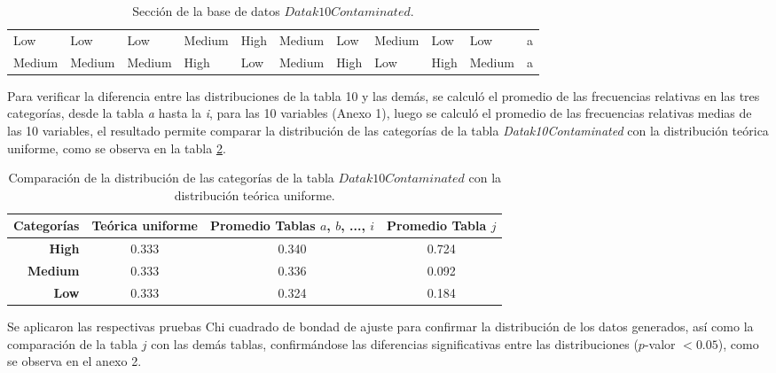 \documentclass[mathematics,article,submit,moreauthors,pdftex]{mdpi}
\begin{document}
\begin{table}[!ht]
{\begin{tabular}{@{}lllllllllll@{}}
Low  & Low    & Low  & Medium & High & Medium & Low    & Medium & Low    & Low    & a                         \\
Medium                       & Medium                         & Medium                       & High                           & Low                          & Medium                         & High                           & Low                            & High                           & Medium                         & a \\ \bottomrule
\end{tabular}
}

\caption{Sección de la base de datos $Datak10Contaminated$.}

\label{tab:tabladatos}

\end{table}

Para verificar la diferencia entre las distribuciones de la tabla 10 y
las demás, se calculó el promedio de las frecuencias relativas en las
tres categorías, desde la tabla \emph{a} hasta la \emph{i}, para las 10
variables (Anexo 1), luego se calculó el promedio de las frecuencias
relativas medias de las 10 variables, el resultado permite comparar la
distribución de las categorías de la tabla \emph{Datak10Contaminated}
con la distribución teórica uniforme, como se observa en la tabla
\ref{tab:tablapromfreq}.

\begin{table}[H]
\centering
\begin{tabular}{rccc}
\hline
\toprule

\textbf{Categorías} & \textbf{Teórica uniforme} & \textbf{Promedio Tablas $a$, $b$, ...,  $i$} & \textbf{Promedio Tabla $j$} \\ \midrule
\textbf{High}       & 0.333            & 0.340                & 0.724            \\ 
\textbf{Medium}     & 0.333            & 0.336                & 0.092            \\ 
\textbf{Low}        & 0.333            & 0.324                & 0.184            \\ \midrule
\end{tabular}
\caption{Comparación de la distribución de las categorías de la tabla $Datak10Contaminated$ con la distribución teórica uniforme.}
\label{tab:tablapromfreq}
\end{table}

Se aplicaron las respectivas pruebas Chi cuadrado de bondad de ajuste
para confirmar la distribución de los datos generados, así como la
comparación de la tabla \(j\) con las demás tablas, confirmándose las
diferencias significativas entre las distribuciones (\(p\)-valor
\(<0.05\)), como se observa en el anexo 2.
\end{document}
